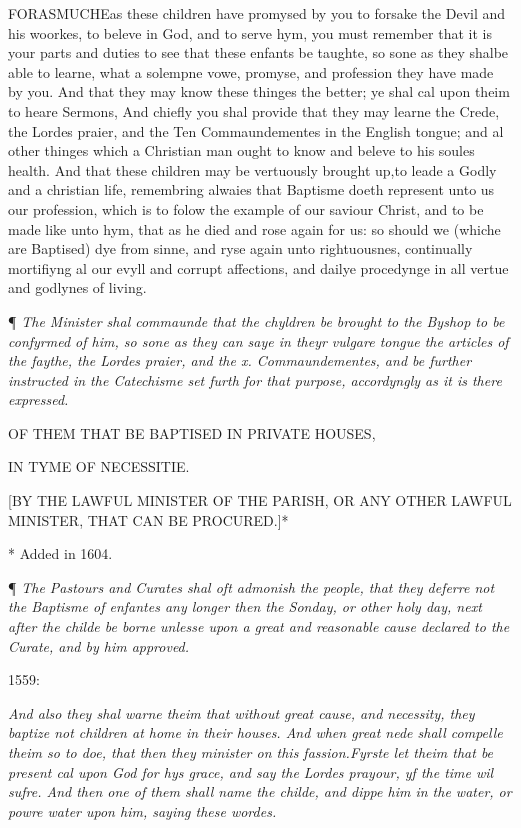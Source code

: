 FORASMUCHE\textbf{}as these children have promysed by you to forsake the Devil and his
woorkes, to beleve in God, and to serve hym, you must remember that it
is your parts and duties to see that these enfants be taughte, so sone
as they shalbe able to learne, what a solempne vowe, promyse, and profession
they have made by you. And that they may know these thinges the better;
ye shal cal upon theim to heare Sermons, And chiefly you shal provide
that they may learne the Crede, the Lordes praier, and the Ten Commaundementes
in the English tongue; and al other thinges which a Christian man ought
to know and beleve to his soules health. And that these children may be
vertuously brought up,\textbf{}to leade a Godly and a christian life, remembring
alwaies that Baptisme doeth represent unto us our profession, which is
to folow the example of our saviour Christ, and to be made like unto hym,
that as he died and rose again for us: so should we (whiche are Baptised)
dye from sinne, and ryse again unto rightuousnes, continually mortifiyng
al our evyll and corrupt affections, and dailye procedynge in all vertue
and godlynes of living.

¶ \emph{The
Minister shal commaunde that the chyldren be brought to the Byshop to
be confyrmed of him, so sone as they can saye in theyr vulgare tongue
the articles of the faythe, the Lordes praier, and the x. Commaundementes,
and be further instructed in the Catechisme set furth for that purpose,
accordyngly as it is there expressed.}

OF
THEM THAT BE
BAPTISED
IN PRIVATE HOUSES,

IN
TYME OF NECESSITIE.

[BY
THE LAWFUL MINISTER OF THE PARISH, OR ANY OTHER LAWFUL MINISTER, THAT
CAN BE PROCURED.]*

*
Added in 1604.

¶ \emph{The
Pastours and Curates shal oft admonish the people, that they deferre not
the Baptisme of enfantes any longer then the Sonday, or other holy day,
next after the childe be borne unlesse upon a great and reasonable cause
declared to the Curate, and by him approved.}

1559:

\emph{And
also they shal warne theim that without great cause, and necessity, they
baptize not children at home in their houses. And when great nede shall
compelle theim so to doe, that then they minister on this fassion.}\emph{Fyrste
let theim that be present cal upon God for hys grace, and say the Lordes
prayour, yf the time wil sufre. And then one of them shall name the childe,
and dippe him in the water, or powre water upon him, saying these wordes.}


